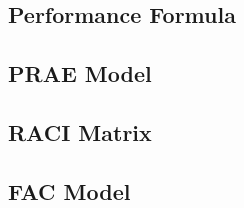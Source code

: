 
\subsection{Performance Formula}
\label{sub-sec:formula}
 \newline

\subsection{PRAE Model}
\label{sub-sec:prae}
 \newline

\subsection{RACI Matrix}
\label{sub-sec:raci}
 \newline

\subsection{FAC Model}
\label{sub-sec:fac}
 \newline